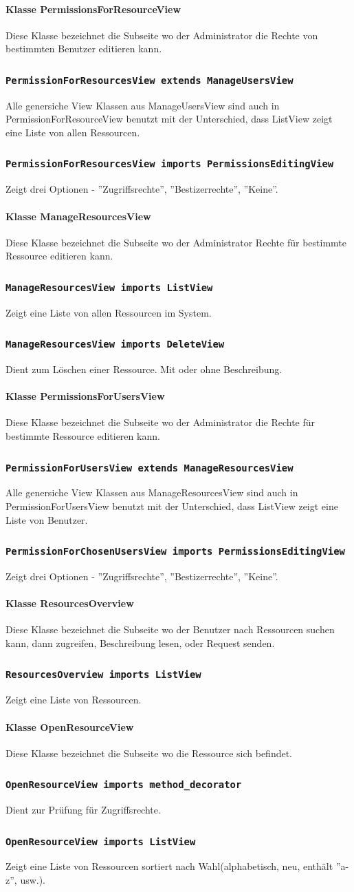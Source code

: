 \documentclass[parskip=full,11pt]{scrartcl}
\newcommand{\class}[1]{\subsubsection*{\lstinline[basicstyle=\ttfamily\large]{#1}}}
\begin{document}
\paragraph*{Klasse PermissionsForResourceView}
 Diese Klasse bezeichnet die Subseite wo der Administrator die Rechte von bestimmten Benutzer editieren kann.
 \class{PermissionForResourcesView extends ManageUsersView}
 Alle genersiche View Klassen aus ManageUsersView sind auch in PermissionForResourceView benutzt mit der Unterschied, dass ListView zeigt eine Liste von allen Ressourcen.
 \class{PermissionForResourcesView imports PermissionsEditingView}
 Zeigt drei Optionen - ''Zugriffsrechte'', ''Bestizerrechte'', ''Keine''.
 
\paragraph*{Klasse ManageResourcesView}
Diese Klasse bezeichnet die Subseite wo der Administrator Rechte für bestimmte Ressource editieren kann.
\class{ManageResourcesView imports ListView}
Zeigt eine Liste von allen Ressourcen im System.
\class{ManageResourcesView imports DeleteView}
Dient zum Löschen einer Ressource. Mit oder ohne Beschreibung.

\paragraph*{Klasse PermissionsForUsersView}
 Diese Klasse bezeichnet die Subseite wo der Administrator die Rechte für bestimmte Ressource editieren kann.
 \class{PermissionForUsersView extends ManageResourcesView}
 Alle genersiche View Klassen aus ManageResourcesView sind auch in PermissionForUsersView benutzt mit der Unterschied, dass ListView zeigt eine Liste von Benutzer.
 \class{PermissionForChosenUsersView imports PermissionsEditingView}
 Zeigt drei Optionen - ''Zugriffsrechte'', ''Bestizerrechte'', ''Keine''.

\paragraph*{Klasse ResourcesOverview}
Diese Klasse bezeichnet die Subseite wo der Benutzer nach Ressourcen suchen kann, dann zugreifen, Beschreibung lesen, oder Request senden.
\class{ResourcesOverview imports ListView}
Zeigt eine Liste von Ressourcen.

\paragraph*{Klasse OpenResourceView}
Diese Klasse bezeichnet die Subseite wo die Ressource sich befindet.
\class{OpenResourceView imports method_decorator}
Dient zur Prüfung für Zugriffsrechte.
\class{OpenResourceView imports ListView}
Zeigt eine Liste von Ressourcen sortiert nach Wahl(alphabetisch, neu, enthält ''a-z'', usw.).
\end{document}
